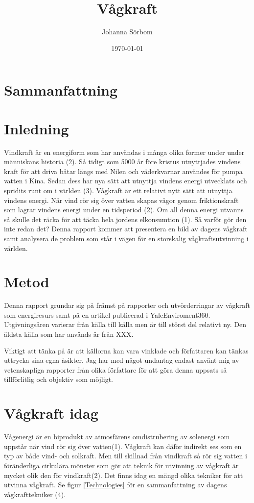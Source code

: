 \documentclass[10pt,a4paper,oneside]{article}
\newcommand{\titlepicture}[2][]{%
  \renewcommand\placetitlepicture{%
    \texttt{[image: \#2]}\par\medskip
  }%
}
\newcommand{\placetitlepicture}{}
\begin{document}
\title{Vågkraft \\ 
\large }
\author{\small Johanna Sörbom}
\date{\small \today}
\titlepicture[width=3in]{Wave}

\maketitle
\newpage

\section{Sammanfattning}
\newpage

\tableofcontents
\newpage

\section{Inledning}
Vindkraft är en energiform som har användas i många olika former under under människans historia (2). Så tidigt som 5000 år före kristus utnyttjades vindens kraft för att driva båtar längs med Nilen och väderkvarnar användes för pumpa vatten i Kina. Sedan dess har nya sätt att utnyttja vindens energi utvecklats och spridits runt om i världen (3). Vågkraft är ett relativt nytt sätt att utnyttja vindens energi. När vind rör sig över vatten skapas vågor genom friktionskraft som lagrar vindens energi under en tidsperiod (2). Om all denna energi utvanns så skulle det räcka för att täcka hela jordens elkonsumtion (1). Så varför gör den inte redan det? Denna rapport kommer att presentera en bild av dagens vågkraft samt analysera de problem som står i vägen för en storskalig vågkraftsutvinning i världen. \\

\section{Metod}
Denna rapport grundar sig på främst på rapporter och utvörderringar av vågkraft som energiresurs samt på en artikel publicerad i YaleEnviroment360. Utgivningsåren varierar från källa till källa men är till störst del relativt ny. Den äldsta källa som har används är från XXX. 

Viktigt att tänka på är att källorna kan vara vinklade och författaren kan tänkas uttrycka sina egna åsikter. Jag har med något undantag endast använt mig av vetenskapliga rapporter från olika författare för att göra denna uppsats så tillförlitlig och objektiv som möjligt. 

\section{Vågkraft idag}
Vågenergi är en biprodukt av atmosfärens omdistrubering av solenergi som uppstår när vind rör sig över vatten(1). Vågkraft kan däför indirekt ses som en typ av både vind- och solkraft. Men till skillnad från vindkraft så rör sig vatten i föränderliga cirkulära mönster som gör att teknik för utvinning av vågkraft är mycket olik den för vindkraft(2). Det finns idag en mängd olika tekniker för att utvinna vågkraft. Se figur \ref{Technologies} för en sammanfattning av dagens vågkrafttekniker (4).\\
\end{document}
